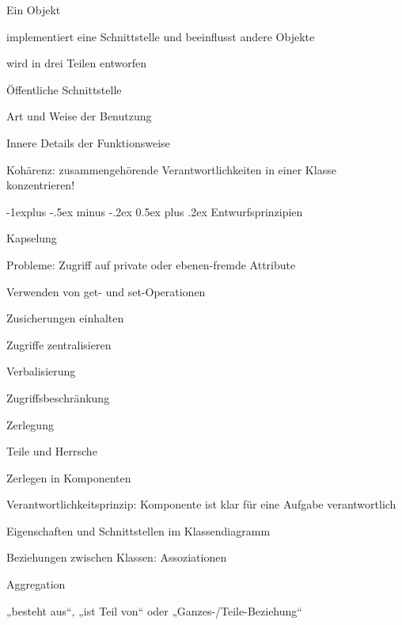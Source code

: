 \documentclass[a4paper]{article}
\makeatletter
\renewcommand{\subsection}{\@startsection{subsection}{2}{0mm}%
                                {-1explus -.5ex minus -.2ex}%
                                {0.5ex plus .2ex}%
                                {\normalfont\normalsize\bfseries}}
\makeatother
\begin{document}
\begin{multicols}{3}
  Ein Objekt
  \begin{itemize*}
    \item implementiert eine Schnittstelle und beeinflusst andere Objekte
    \item wird in drei Teilen entworfen
    \begin{itemize*}
      \item Öffentliche Schnittstelle
      \item Art und Weise der Benutzung
      \item Innere Details der Funktionsweise
    \end{itemize*}
    \item Kohärenz: zusammengehörende Verantwortlichkeiten in einer Klasse konzentrieren!
  \end{itemize*}


  \subsection{Entwurfsprinzipien}
  \begin{itemize*}
    \item Kapselung
    \begin{itemize*}
      \item Probleme: Zugriff auf private oder ebenen-fremde Attribute
      \item Verwenden von get- und set-Operationen
      \item Zusicherungen einhalten
      \item Zugriffe zentralisieren
      \item Verbalisierung
      \item Zugriffsbeschränkung
    \end{itemize*}
    \item Zerlegung
    \begin{itemize*}
      \item Teile und Herrsche
      \item Zerlegen in Komponenten
      \item Verantwortlichkeitsprinzip: Komponente ist klar für eine Aufgabe verantwortlich
      \item Eigenschaften und Schnittstellen im Klassendiagramm
      \item Beziehungen zwischen Klassen: Assoziationen
      \item Aggregation
      \begin{itemize*}
        \item „besteht aus“, „ist Teil von“ oder „Ganzes-/Teile-Beziehung“

\end{itemize*}
\end{itemize*}
\end{itemize*}
\end{multicols}
\end{document}
